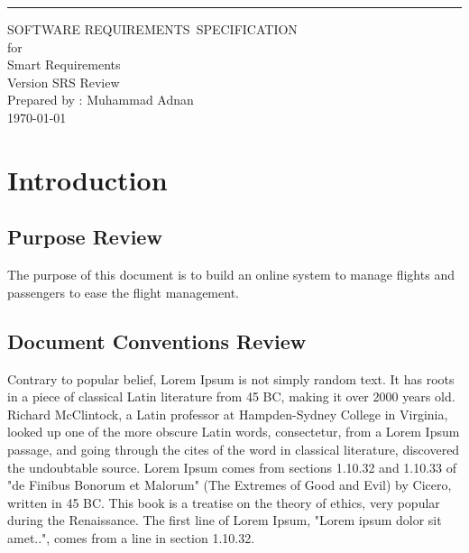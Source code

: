 \documentclass{scrreprt}
\date{}
\def\myversion{SRS Review}
\begin{document}
    
    \begin{flushright}
        \rule{16cm}{5pt}\vskip1cm
        \begin{bfseries}
            \Huge{SOFTWARE REQUIREMENTS\ SPECIFICATION}\
            \vspace{1.5cm} 
            \\for\\
            \vspace{1.5cm}
            Smart Requirements\\
            \vspace{1.5cm}
            \LARGE{Version \myversion}\\
            \vspace{1.5cm}
            Prepared by : Muhammad Adnan\\ 
            \vspace{1.5cm}
            \today\
        \end{bfseries}
    \end{flushright}
    
    
    \tableofcontents
    
    \chapter{Introduction} 
    \section{Purpose Review}
    The purpose of this document is to build an online system to manage flights and passengers to ease the flight management.
    \section{Document Conventions Review} 
    Contrary to popular belief, Lorem Ipsum is not simply random text. It has roots in a piece of classical Latin literature from 45 BC, making it over 2000 years old. Richard McClintock, a Latin professor at Hampden-Sydney College in Virginia, looked up one of the more obscure Latin words, consectetur, from a Lorem Ipsum passage, and going through the cites of the word in classical literature, discovered the undoubtable source. Lorem Ipsum comes from sections 1.10.32 and 1.10.33 of "de Finibus Bonorum et Malorum" (The Extremes of Good and Evil) by Cicero, written in 45 BC. This book is a treatise on the theory of ethics, very popular during the Renaissance. The first line of Lorem Ipsum, "Lorem ipsum dolor sit amet..", comes from a line in section 1.10.32.
\end{document}
